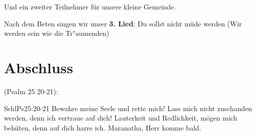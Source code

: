 \documentclass[12pt,a4paper]{scrarticle}
\begin{document}
Und ein zweiter Teilnehmer für unsere kleine Gemeinde.

Nach dem Beten singen wir unser \textbf{3. Lied}: Du sollst nicht m\"ude werden (Wir werden sein wie die Tr\̈"aumenden)

\section{Abschluss}
(Psalm 25 20-21):
\begin{bibeltext}{Schl}{Ps}{25:20-21}
Bewahre meine Seele und rette mich! Lass mich nicht zuschanden werden, denn ich vertraue auf dich! Lauterkeit und Redlichkeit, mögen mich behüten, denn auf dich harre ich.
Maranatha, Herr komme bald.
\end{bibeltext}
\end{document}
